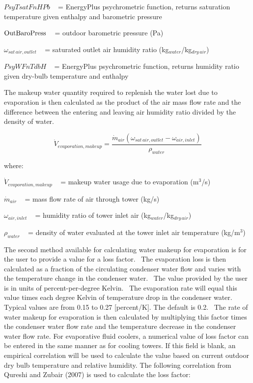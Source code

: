 \(PsyTsatFnHPb\) ~ = EnergyPlus psychrometric function, returns saturation temperature given enthalpy and barometric pressure

\({\rm{OutBaroPress}}\) ~ = outdoor barometric pressure (Pa)

\({\omega_{sat\,air,outlet}}\) ~ = saturated outlet air humidity ratio (kg\(_{water}\)/kg\(_{dry\, air}\))

\(PsyWFnTdbH\) ~ = EnergyPlus psychrometric function, returns humidity ratio given dry-bulb temperature and enthalpy

The makeup water quantity required to replenish the water lost due to evaporation is then calculated as the product of the air mass flow rate and the difference between the entering and leaving air humidity ratio divided by the density of water.

\begin{equation}
{\dot V_{evaporation,makeup}} = \frac{{{{\dot m}_{air}}\left( {{\omega_{sat\,air,outlet}} - {\omega_{air,inlet}}} \right)}}{{{\rho_{water}}}}
\end{equation}

where:

\({\dot V_{evaporation,makeup}}\) ~ = makeup water usage due to evaporation (m\(^{3}\)/s)

\({\dot m_{air}}\) ~ = mass flow rate of air through tower (kg/s)

\({\omega_{air,inlet}}\) ~ = humidity ratio of tower inlet air (kg\(_{water}\)/kg\(_{dry\, air}\))

\({\rho_{water}}\) ~ = density of water evaluated at the tower inlet air temperature (kg/m\(^{3}\))

The second method available for calculating water makeup for evaporation is for the user to provide a value for a loss factor.~ The evaporation loss is then calculated as a fraction of the circulating condenser water flow and varies with the temperature change in the condenser water.~ The value provided by the user is in units of percent-per-degree Kelvin.~ The evaporation rate will equal this value times each degree Kelvin of temperature drop in the condenser water.~ Typical values are from 0.15 to 0.27 {[}percent/K{]}. The default is 0.2.~ The rate of water makeup for evaporation is then calculated by multiplying this factor times the condenser water flow rate and the temperature decrease in the condenser water flow rate. For evaporative fluid coolers, a numerical value of loss factor can be entered in the same manner as for cooling towers. If this field is blank, an empirical correlation will be used to calculate the value based on current outdoor dry bulb temperature and relative humidity. The following correlation from Qureshi and Zubair (2007) is used to calculate the loss factor:

